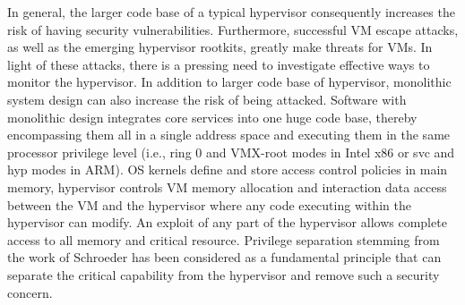 \documentclass[conference]{IEEEtran}
\begin{document}
In general, the larger code base of a typical hypervisor consequently increases the risk of having security vulnerabilities.
Furthermore, successful VM escape attacks, as well as the emerging hypervisor rootkits, greatly make threats for VMs.
In light of these attacks, there is a pressing need to investigate effective ways to monitor the hypervisor. 
In addition to larger code base of hypervisor, monolithic system design can also increase the risk of being attacked.
Software with monolithic design integrates core services into one huge code base, thereby encompassing them all in a single address space and executing them in the same processor privilege level (i.e., ring 0 and VMX-root modes in Intel x86 or svc and hyp modes in ARM).
OS kernels define and store access control policies in main memory, hypervisor controls VM memory allocation and interaction data access between the VM and the hypervisor where any code executing within the hypervisor can modify.
An exploit of any part of the hypervisor allows complete access to all memory and critical resource. %
Privilege separation stemming from the work of Schroeder\cite{zhaobudao} has been considered as a fundamental principle that can separate the critical capability from the hypervisor and remove such a security concern.
\end{document}
